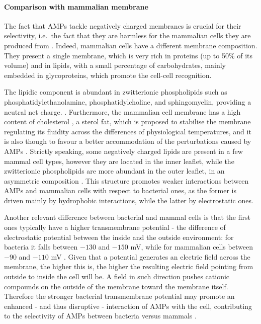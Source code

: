 \paragraph{Comparison with mammalian membrane}
The fact that AMPs tackle negatively charged membranes is crucial for their selectivity, i.e.\ the fact that they are harmless for the mammalian cells they are produced from \cite{Glukhov2005}. Indeed, mammalian cells have a different membrane composition. They present a single membrane, which is very rich in proteins (up to 50\% of its volume) and in lipids, with a small percentage of carbohydrates, mainly embedded in glycoproteins, which promote the cell-cell recognition.

The lipidic component is abundant in zwitterionic phospholipids such as phosphatidylethanolamine, phosphatidylcholine, and sphingomyelin, providing a neutral net charge. \cite{Spector1985,vanMeer2008}.
%
Furthermore, the mammalian cell membrane has a high content of cholesterol \cite{Yeaman2003, Lai2009}, a sterol fat, which is proposed to stabilise the membrane regulating its fluidity across the differences of physiological temperatures, and it is also though to favour a better accommodation of the perturbations caused by AMPs \cite{Zasloff2002}.
%
Strictly speaking, some negatively charged lipids are present in a few mammal cell types, however they are located in the inner leaflet, while the zwitterionic phospholipids are more abundant in the outer leaflet, in an asymmetric composition \cite{???}.
%
This structure promotes weaker interactions between AMPs and mammalian cells with respect to bacterial ones, as the former is driven mainly by hydrophobic interactions, while the latter by electrostatic ones.

Another relevant difference between bacterial and mammal cells is that the first ones typically have a higher transmembrane potential - the difference of electrostatic potential between the inside and the outside environment: for bacteria it falls between $-130$ and $-150$ mV, while for mammalian cells between $-90$ and $-110$ mV \cite{Yeaman2003,Matsuzaki2009,Ebenhan2014}.
%
Given that a potential generates an electric field across the membrane, the higher this is, the higher the resulting electric field pointing from outside to inside the cell will be. A field in such direction pushes cationic compounds on the outside of the membrane toward the membrane itself. Therefore the stronger bacterial transmembrane potential may promote an enhanced - and thus disruptive - interaction of AMPs with the cell, contributing to the selectivity of AMPs between bacteria versus mammals \cite{Yeaman2003}.


